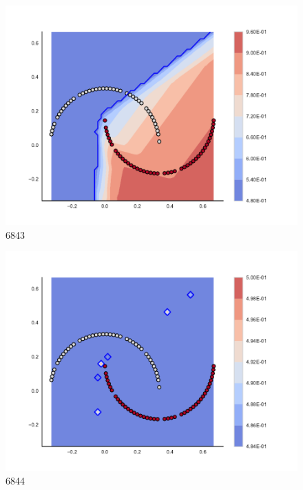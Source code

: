 \begin{subfigure}[b]{0.09\textwidth}
    \includegraphics[clip, trim=2.35cm 1.75cm 4.5cm 0cm,width=\textwidth]{img/convergence/6843.pdf}
    \caption{6843}
    \label{fig:convergence_6843}
\end{subfigure}
%
\begin{subfigure}[b]{0.09\textwidth}
    \includegraphics[clip, trim=2.35cm 1.75cm 4.5cm 0cm,width=\textwidth]{img/convergence/6844.pdf}
    \caption{6844}
    \label{fig:convergence_6844}
\end{subfigure}
%
